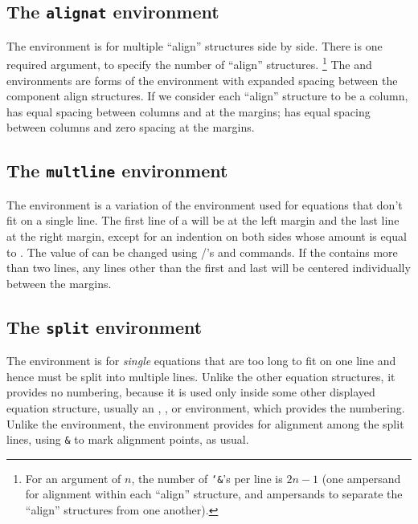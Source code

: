 \subsection{The {\tt alignat} environment}
The  environment is for multiple ``align'' structures
side by side.  There is one required argument, to specify the number
of ``align'' structures.%
%
\footnote{For an argument of $n$, the number of {\tt\char`\&}'s
per line is $2n-1$ (one ampersand for alignment within each
``align'' structure, and ampersands to separate the ``align'' structures
from one another).}
%
The  and  environments
are forms of the  environment with expanded spacing
between the component align structures.  If we consider each
``align'' structure to be a column,  has equal
spacing between columns and at the margins; 
has equal spacing between columns and zero spacing at the
margins.

\subsection{The {\tt multline} environment} The 
environment is a variation of the  environment used for
equations that don't fit on a single line.  The first line of a
 will be at the left margin and the last line at the right
margin, except for an indention on both sides whose amount is equal to
.  The value of  can be changed using
\latex/'s  and  commands.  If the
 contains more than two lines, any lines other than the
first and last will be centered individually between the margins.

\subsection{The {\tt split} environment} The  environment
is for {\em single} equations that are too long to fit on one line and
hence must be split into multiple lines.  Unlike the other
 equation structures, it provides no numbering, because it
is used only inside some other displayed equation structure, usually
an , , or  environment, which
provides the numbering.  Unlike
the  environment, the  environment provides
for alignment among the split lines, using \verb"&" to mark alignment
points, as usual.

